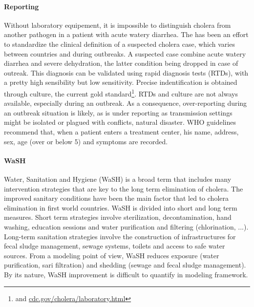 \paragraph{Reporting} Without laboratory equipement, it is impossible to distinguish cholera from another pathogen in a patient with acute watery diarrhea. The has been an effort to standardize the clinical definition of a suspected cholera case, which varies between countries and during outbreaks. A suspected case combine acute watery diarrhea and severe dehydration, the latter condition being dropped in case of outreak. This diagnosis can be validated using rapid diagnosis tests (RTDs), with a pretty high sensibility but low sensitivity. Precise indentification is obtained through culture, the current gold standard\footnote{ and \url{cdc.gov/cholera/laboratory.html}}. RTDs and culture are not always available, especially during an outbreak.  As a consequence, over-reporting during an outbreak situation is likely, as is under reporting as transmission settings might be isolated or plagued with conflicts, natural disaster. WHO guidelines recommend that, when a patient enters a treatment center, his name, address, sex, age (over or below 5) and symptoms are recorded\cite{WHO:FirstStepsManaging:2010}. %

\paragraph{WaSH} Water, Sanitation and Hygiene (WaSH) is a broad term that includes many intervention strategies that are key to the long term elimination of cholera. The improved sanitary conditions have been the main factor that led to cholera elimination  in first world countries. WaSH is divided into short and long term measures. Short term strategies involve sterilization, decontamination, hand washing, education sessions and water purification and filtering (chlorination, ...)\cite{Rebaudet:NationalAlertresponseStrategy:2018,Fewtrell:WaterSanitationHygiene:2005}. Long-term sanitation strategies involve the construction of infrastructures for fecal sludge management, sewage systems, toilets and access to safe water sources. From a modeling point of view, WaSH reduces exposure (water purification, sari filtration) and shedding (sewage and fecal sludge management). By its nature, WaSH improvement is difficult to quantify in modeling framework.

